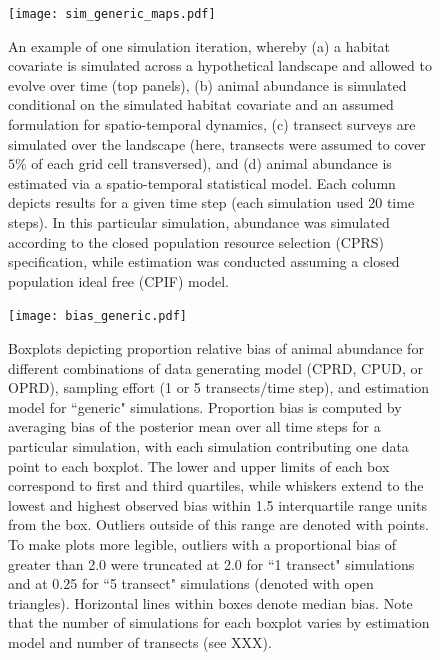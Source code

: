 \documentclass[times,mee,doublespace,]{besauth2}
\begin{document}
\begin{figure}
\begin{center}
\texttt{[image: sim\_generic\_maps.pdf]}
\caption{An example of one simulation iteration, whereby (a) a habitat covariate is simulated across a hypothetical landscape and allowed to evolve over time (top panels), (b) animal abundance is simulated conditional on the simulated habitat covariate and an assumed formulation for spatio-temporal dynamics, (c) transect surveys are simulated over the landscape (here, transects were assumed to cover $5\%$ of each grid cell transversed), and (d) animal abundance is estimated via a spatio-temporal statistical model.  Each column depicts results for a given time step (each simulation used 20 time steps).  In this particular simulation, abundance was simulated according to the closed population resource selection (CPRS) specification, while estimation was conducted assuming a closed population ideal free (CPIF) model.}
\label{fig:sim_maps}
\end{center}
\end{figure}

\begin{figure}
\begin{center}
\texttt{[image: bias\_generic.pdf]}
\caption{Boxplots depicting proportion relative bias of animal abundance for different combinations of data generating model (CPRD, CPUD, or OPRD), sampling effort (1 or 5 transects/time step), and estimation model for ``generic" simulations.  Proportion bias is computed by averaging bias of the posterior mean over all time steps for a particular simulation, with each simulation contributing one data point to each boxplot.  The lower and upper limits of each box correspond to first and third quartiles, while whiskers extend to the lowest and highest observed bias within 1.5 interquartile range units from the box.  Outliers outside of this range are denoted with points.  To make plots more legible, outliers with a proportional bias of greater than 2.0 were truncated at 2.0 for ``1 transect" simulations and at 0.25 for ``5 transect" simulations (denoted with open triangles). Horizontal lines within boxes denote median bias.  Note that the number of simulations for each boxplot varies by estimation model and number of transects (see XXX).
}
\label{fig:sim_maps}
\end{center}
\end{figure}
\end{document}
